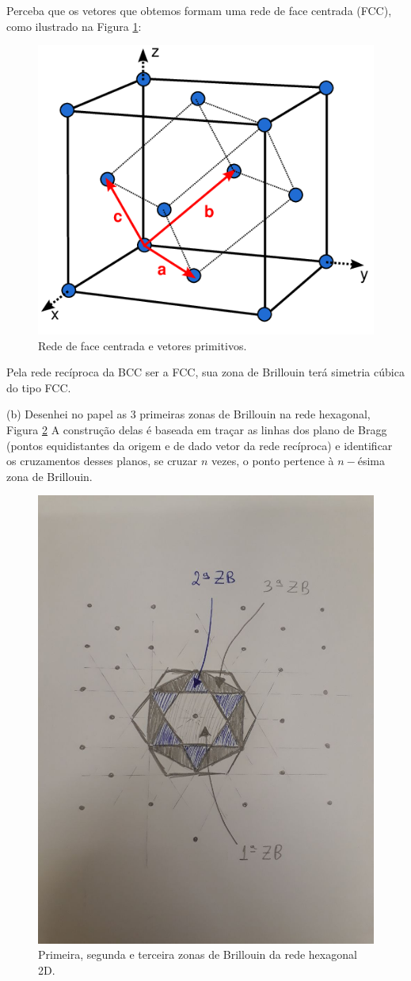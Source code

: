 \documentclass[a4paper,10pt]{article}
\begin{document}
\begin{itemize}
Perceba que os vetores que obtemos formam uma rede de face centrada (FCC), como ilustrado na Figura \ref{fig:fcc}:
\begin{figure}[H]
\centering
\includegraphics[width=0.4\linewidth]{fig/fcc.png}
\caption{Rede de face centrada e vetores primitivos.}
\label{fig:fcc}
\end{figure}

Pela rede recíproca da BCC ser a FCC, sua zona de Brillouin terá simetria cúbica do tipo FCC.
\end{itemize}


(b) Desenhei no papel as 3 primeiras zonas de Brillouin na rede hexagonal, Figura \ref{fig:hex_bz-123} A construção delas é baseada em traçar as linhas dos plano de Bragg (pontos equidistantes da origem e de dado vetor da rede recíproca) e identificar os cruzamentos desses planos, se cruzar $n$ vezes, o ponto pertence à $n-$ésima zona de Brillouin.
\begin{figure}[H]
\centering
\includegraphics[width=0.7\linewidth]{fig/hex_bz-123.jpg}
\caption{Primeira, segunda e terceira zonas de Brillouin da rede hexagonal 2D.}
\label{fig:hex_bz-123}
\end{figure}
\end{document}
